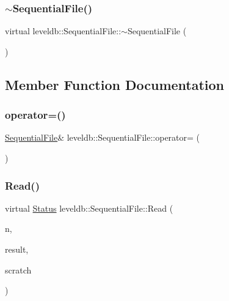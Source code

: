 \subsubsection{\texorpdfstring{$\sim$SequentialFile()}{~SequentialFile()}}
{\footnotesize\ttfamily virtual leveldb\+::\+Sequential\+File\+::$\sim$\+Sequential\+File (\begin{DoxyParamCaption}{ }\end{DoxyParamCaption})\hspace{0.3cm}{\ttfamily [virtual]}}



\subsection{Member Function Documentation}
\mbox{\label{classleveldb_1_1_sequential_file_aa3631a78fbab52652dbdd08d9e1e41a7}} 
\subsubsection{\texorpdfstring{operator=()}{operator=()}}
{\footnotesize\ttfamily \mbox{\hyperlink{classleveldb_1_1_sequential_file}{Sequential\+File}}\& leveldb\+::\+Sequential\+File\+::operator= (\begin{DoxyParamCaption}\item[{const \mbox{\hyperlink{classleveldb_1_1_sequential_file}{Sequential\+File}} \&}]{ }\end{DoxyParamCaption})\hspace{0.3cm}{\ttfamily [delete]}}

\mbox{\label{classleveldb_1_1_sequential_file_a4136bef1546cdb9fbbd477a635460261}} 
\subsubsection{\texorpdfstring{Read()}{Read()}}
{\footnotesize\ttfamily virtual \mbox{\hyperlink{classleveldb_1_1_status}{Status}} leveldb\+::\+Sequential\+File\+::\+Read (\begin{DoxyParamCaption}\item[{size\+\_\+t}]{n,  }\item[{\mbox{\hyperlink{classleveldb_1_1_slice}{Slice}} $\ast$}]{result,  }\item[{char $\ast$}]{scratch }\end{DoxyParamCaption})\hspace{0.3cm}{\ttfamily [pure virtual]}}

